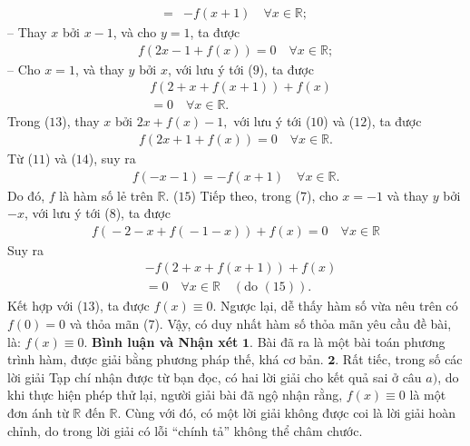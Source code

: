 \begin{multicols}{2}
\begin{align*}
		=  &- f\left( {x + 1} \right) \quad\forall x \in \mathbb{R}; \tag{$11$}
	\end{align*}
	-- Thay $x$ bởi $x - 1$, và cho $y = 1$, ta được
	\begin{align*}
		f\left( {2x - 1 + f\left( x \right)} \right) = 0 \quad\forall x \in \mathbb{R}; \tag{$12$}
	\end{align*}
	-- Cho $x = 1$, và thay $y$ bởi $x$, với lưu ý tới ($9$), ta được
	\begin{align*}
		&f\left( {2 + x + f\left( {x + 1} \right)} \right) + f\left( x \right) \\
		&= 0 \quad\forall x \in \mathbb{R}. \tag{$13$}
	\end{align*}
	Trong ($13$), thay $x$ bởi  $2x + f\left( x \right) - 1,$ với lưu ý tới ($10$) và ($12$), ta được
	\begin{align*}
		f\left( {2x + 1 + f\left( x \right)} \right) = 0 \quad
		\forall x \in \mathbb{R}. \tag{$14$}
	\end{align*}
	Từ ($11$) và ($14$), suy ra
	\begin{align*}
		f\left( { - x - 1} \right) =  - f\left( {x + 1} \right) \quad\forall x \in \mathbb{R}. \tag{$15$}
	\end{align*}
	Do đó, $f$ là hàm số lẻ trên $\mathbb{R}$. \hfill ($15$)
	\vskip 0.05cm
	Tiếp theo, trong ($7$), cho $x = -1$ và thay $y$ bởi $-x$, với lưu ý tới ($8$), ta được
	\begin{align*}
		f\left( { \!-\! 2 \!-\! x \!+\! f\left( { \!-\! 1 \!-\! x} \right)} \right) \!+\! f\left( x \right) \!=\! 0 \quad\forall x \in \mathbb{R}
	\end{align*}
	Suy ra
	\begin{align*}
		&-f\left( {2 + x + f\left( {x + 1} \right)} \right) + f\left( x \right) \\
		&= 0 \quad
		\forall x \in \mathbb{R} \quad(\text{do } (15)).
	\end{align*}
	Kết hợp với ($13$), ta được  $f(x) \equiv 0$.
	\vskip 0.05cm
	Ngược lại, dễ thấy hàm số vừa nêu trên có $f(0) = 0$  và thỏa mãn ($7$).
	\vskip 0.05cm
	Vậy, có duy nhất hàm số thỏa mãn yêu cầu đề bài, là: $f(x) \equiv 0$.
	\vskip 0.05cm  
	\textbf{\color{thachthuctoanhoc}Bình luận và Nhận xét}
	\vskip 0.05cm
	$\pmb{1.}$ Bài đã ra là một bài toán phương trình hàm, được giải bằng phương pháp thế, khá cơ bản.
	\vskip 0.05cm
	$\pmb{2.}$ Rất tiếc, trong số các lời giải Tạp chí nhận được từ bạn đọc, có hai lời giải cho kết quả sai ở câu $a)$, do khi thực hiện phép thử lại, người giải bài đã ngộ nhận rằng, $f(x) \equiv 0$  là một đơn ánh từ $\mathbb{R}$  đến  $\mathbb{R}$. Cùng với đó, có một lời giải không được coi là lời giải hoàn chỉnh, do trong lời giải có lỗi “chính tả” không thể châm chước.

\end{multicols}
